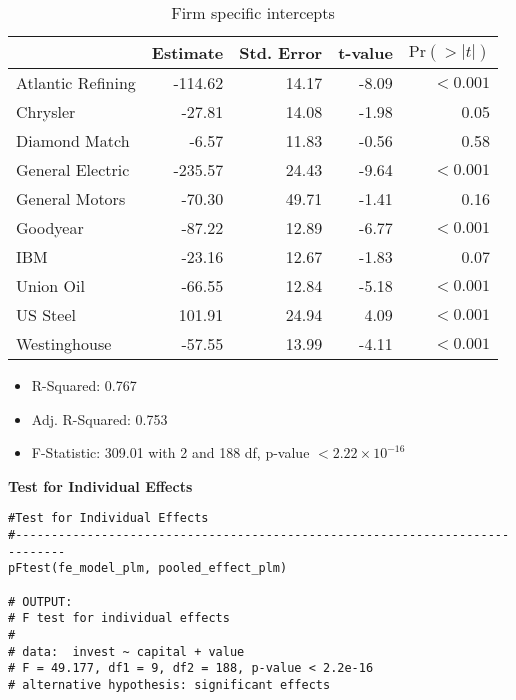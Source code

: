\documentclass[a4paper]{article}
\begin{document}
\begin{table}[ht]
    \centering
    \begin{tabular}{lrrrr}
    \toprule
     & {Estimate} & {Std. Error} & {t-value} & \(\text{Pr}(>|t|)\) \\ \midrule
    Atlantic Refining   & -114.62 & 14.17 & -8.09  & $<0.001$ \\ 
    Chrysler            & -27.81  & 14.08 & -1.98  & 0.05  \\ 
    Diamond Match       & -6.57   & 11.83 & -0.56  & 0.58 \\ 
    General Electric    & -235.57 & 24.43 & -9.64  & $<0.001$ \\ 
    General Motors      & -70.30  & 49.71 & -1.41  & 0.16 \\ 
    Goodyear            & -87.22  & 12.89 & -6.77  & $<0.001$ \\ 
    IBM                 & -23.16  & 12.67 & -1.83  & 0.07  \\ 
    Union Oil           & -66.55  & 12.84 & -5.18  & $<0.001$  \\ 
    US Steel            & 101.91  & 24.94 & 4.09   & $<0.001$  \\ 
    Westinghouse        & -57.55  & 13.99 & -4.11  & $<0.001$  \\
    \bottomrule
    \end{tabular}
    \caption{Firm specific intercepts}
\end{table}
    
\begin{itemize}
    \item R-Squared: 0.767
    \item Adj. R-Squared: 0.753
    \item F-Statistic: 309.01 with 2 and 188 df, p-value \(<2.22 \times 10^{-16}\) 
\end{itemize}

\noindent\textbf{Test for Individual Effects}

\begin{lstlisting}[caption={R Code for Test for Individual Effects}]
#Test for Individual Effects
#-----------------------------------------------------------------------------
pFtest(fe_model_plm, pooled_effect_plm)

# OUTPUT:
# F test for individual effects
# 
# data:  invest ~ capital + value
# F = 49.177, df1 = 9, df2 = 188, p-value < 2.2e-16
# alternative hypothesis: significant effects
\end{lstlisting}
\end{document}
